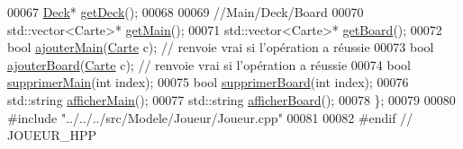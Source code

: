 \begin{DoxyCode}
00067         \hyperlink{class_deck}{Deck}* \hyperlink{class_joueur_a5f7a140f00766144edf7d6a5b0f236b7}{getDeck}();    
00068 
00069         \textcolor{comment}{//Main/Deck/Board}
00070         std::vector<Carte>* \hyperlink{class_joueur_a569fa77a585a0e82981bfa6bda149a4f}{getMain}();      
00071         std::vector<Carte>* \hyperlink{class_joueur_abe6504e86cf56787e5569c296e3bfde7}{getBoard}();     
00072         \textcolor{keywordtype}{bool} \hyperlink{class_joueur_a0b94001f3dd61af944bd7128d143ac11}{ajouterMain}(\hyperlink{class_carte}{Carte} c); \textcolor{comment}{// renvoie vrai si l'opération a réussie}
00073         \textcolor{keywordtype}{bool} \hyperlink{class_joueur_a5046cd3251b93c58558ca273db1aa23b}{ajouterBoard}(\hyperlink{class_carte}{Carte} c); \textcolor{comment}{// renvoie vrai si l'opération a réussie}
00074         \textcolor{keywordtype}{bool} \hyperlink{class_joueur_ae1c641d98c6e9fda547c3b7e923f085e}{supprimerMain}(\textcolor{keywordtype}{int} index);
00075         \textcolor{keywordtype}{bool} \hyperlink{class_joueur_af086855b254a628bc9c07047142fb33c}{supprimerBoard}(\textcolor{keywordtype}{int} index);
00076         std::string \hyperlink{class_joueur_a4a41ec6aaa2e7b4a55807b86cc286876}{afficherMain}();
00077         std::string \hyperlink{class_joueur_aae890e668b097dddee94a61404553c8f}{afficherBoard}();    
00078 \};
00079 
00080 \textcolor{preprocessor}{#include "../../../src/Modele/Joueur/Joueur.cpp"}
00081 
00082 \textcolor{preprocessor}{#endif // JOUEUR\_HPP        }
\end{DoxyCode}

